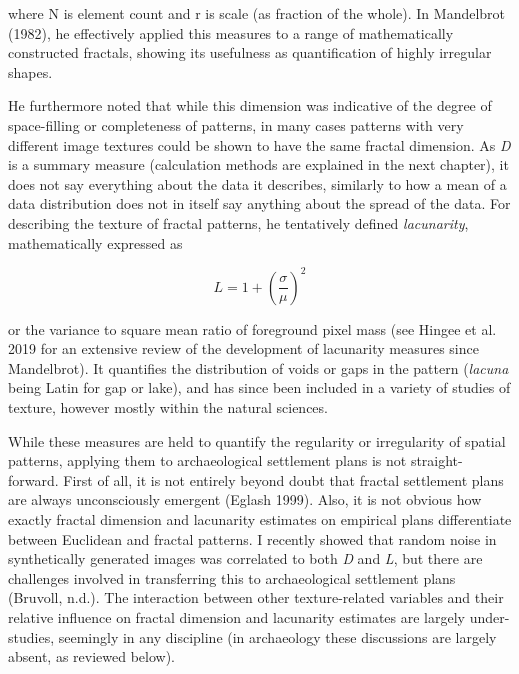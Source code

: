 \documentclass[
  12pt,
  a4paper, twoside]{book}
\begin{document}
where N is element count and r is scale (as fraction of the whole). In Mandelbrot (1982), he effectively applied this measures to a range of mathematically constructed fractals, showing its usefulness as quantification of highly irregular shapes.

He furthermore noted that while this dimension was indicative of the degree of space-filling or completeness of patterns, in many cases patterns with very different image textures could be shown to have the same fractal dimension. As \emph{D} is a summary measure (calculation methods are explained in the next chapter), it does not say everything about the data it describes, similarly to how a mean of a data distribution does not in itself say anything about the spread of the data. For describing the texture of fractal patterns, he tentatively defined \emph{lacunarity}, mathematically expressed as

\[
L = 1 + (\frac{\sigma}{\mu})^2 
\]

or the variance to square mean ratio of foreground pixel mass (see Hingee et al. 2019 for an extensive review of the development of lacunarity measures since Mandelbrot). It quantifies the distribution of voids or gaps in the pattern (\emph{lacuna} being Latin for gap or lake), and has since been included in a variety of studies of texture, however mostly within the natural sciences.

While these measures are held to quantify the regularity or irregularity of spatial patterns, applying them to archaeological settlement plans is not straight-forward. First of all, it is not entirely beyond doubt that fractal settlement plans are always unconsciously emergent (Eglash 1999). Also, it is not obvious how exactly fractal dimension and lacunarity estimates on empirical plans differentiate between Euclidean and fractal patterns. I recently showed that random noise in synthetically generated images was correlated to both \emph{D} and \emph{L}, but there are challenges involved in transferring this to archaeological settlement plans (Bruvoll, n.d.). The interaction between other texture-related variables and their relative influence on fractal dimension and lacunarity estimates are largely under-studies, seemingly in any discipline (in archaeology these discussions are largely absent, as reviewed below).
\end{document}
